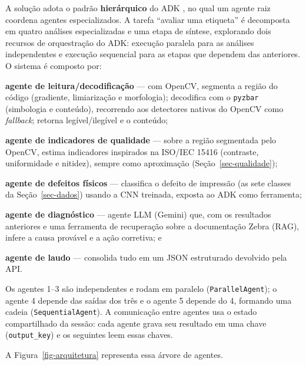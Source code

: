 \documentclass[
	article,			%
	11pt,				%
	oneside,			%
	a4paper,			%
	english,			%
	brazilian,			%
	sumario=tradicional
	]{abntex2}
\begin{document}
A solução adota o padrão \textbf{hierárquico} do ADK \cite{adk_docs}, no qual um
agente raiz coordena agentes especializados. A tarefa ``avaliar uma etiqueta'' é
decomposta em quatro análises especializadas e uma etapa de síntese, explorando
dois recursos de orquestração do ADK: execução paralela para as análises
independentes e execução sequencial para as etapas que dependem das anteriores. O
sistema é composto por:
\begin{alineas}
	\item \textbf{agente de leitura/decodificação} --- com OpenCV, segmenta a região
	do código (gradiente, limiarização e morfologia); decodifica com o \texttt{pyzbar}
	(simbologia e conteúdo), recorrendo aos detectores nativos do OpenCV como
	\textit{fallback}; retorna legível/ilegível e o conteúdo;
	\item \textbf{agente de indicadores de qualidade} --- sobre a região segmentada
	pelo OpenCV, estima indicadores inspirados na ISO/IEC 15416 (contraste,
	uniformidade e nitidez), sempre como aproximação (Seção~\ref{sec-qualidade});
	\item \textbf{agente de defeitos físicos} --- classifica o defeito de impressão
	(as sete classes da Seção~\ref{sec-dados}) usando a CNN treinada, exposta ao
	ADK como ferramenta;
	\item \textbf{agente de diagnóstico} --- agente LLM (Gemini) que, com os
	resultados anteriores e uma ferramenta de recuperação sobre a documentação
	Zebra (RAG), infere a causa provável e a ação corretiva; e
	\item \textbf{agente de laudo} --- consolida tudo em um JSON estruturado
	devolvido pela API.
\end{alineas}

Os agentes 1--3 são independentes e rodam em paralelo (\texttt{ParallelAgent}); o
agente 4 depende das saídas dos três e o agente 5 depende do 4, formando uma
cadeia (\texttt{SequentialAgent}). A comunicação entre agentes usa o estado
compartilhado da sessão: cada agente grava seu resultado em uma chave
(\texttt{output\_key}) e os seguintes leem essas chaves.

A Figura~\ref{fig-arquitetura} representa essa árvore de agentes.
\end{document}
